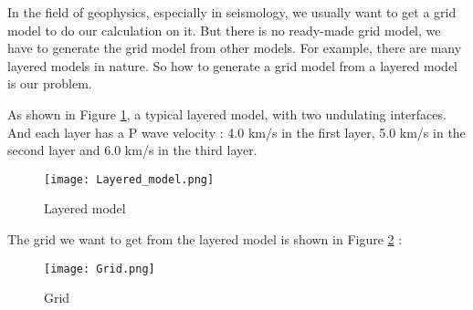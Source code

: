 %
%
%
%
%

In the field of geophysics, especially in seismology, we usually want to get a grid model 
to do our calculation on it. But there is no ready-made grid model, we have to generate 
the grid model from other models. For example, there are many layered models in nature. 
So how to generate a grid model from a layered model is our problem. \par

As shown in Figure \ref{fig:Layered_model}, a typical layered model, with two undulating 
interfaces. And each layer has a P wave velocity : 4.0 km/s in the first layer, 5.0 km/s 
in the second layer and 6.0 km/s in the third layer.
\begin{figure}[h]
    \begin{center}
        \texttt{[image: Layered\_model.png]}
    \end{center}
    \label{fig:Layered_model}
    \caption{Layered model}
\end{figure}

The grid we want to get from the layered model is shown in Figure \ref{fig:Grid} :
\begin{figure}[h]
    \begin{center}
        \texttt{[image: Grid.png]}
    \end{center}
    \label{fig:Grid}
    \caption{Grid}
\end{figure}
